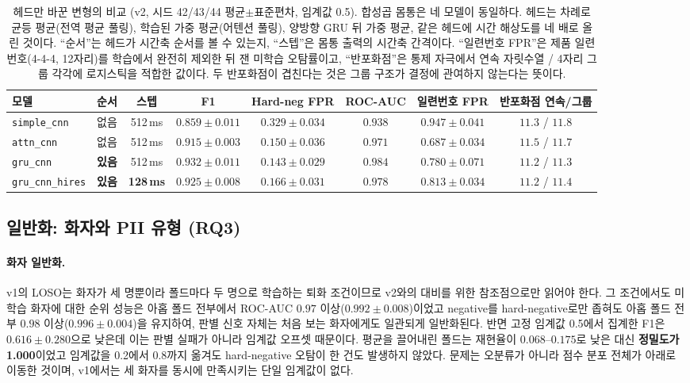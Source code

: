 \documentclass[10pt,twocolumn]{article}
\renewcommand{\emph}[1]{\textbf{#1}}
\begin{document}
\begin{table}[!t]
\centering
\caption{헤드만 바꾼 변형의 비교 (v2, 시드 42/43/44 평균$\pm$표준편차, 임계값 0.5). 합성곱
몸통은 네 모델이 동일하다. 헤드는 차례로 균등 평균(전역 평균 풀링), 학습된 가중 평균(어텐션
풀링), 양방향 GRU 뒤 가중 평균, 같은 헤드에 시간 해상도를 네 배로 올린 것이다. ``순서''는 헤드가
시간축 순서를 볼 수 있는지, ``스텝''은 몸통 출력의 시간축 간격이다. ``일련번호 FPR''은 제품 일련번호(4-4-4, 12자리)를 학습에서 완전히 제외한 뒤 잰
미학습 오탐률이고, ``반포화점''은 통제 자극에서 연속 자릿수열 / 4자리 그룹 각각에 로지스틱을
적합한 값이다. 두 반포화점이 겹친다는 것은 그룹 구조가 결정에 관여하지 않는다는 뜻이다.}
\label{tab:seqhead}
\small
\setlength{\tabcolsep}{5pt}
\begin{tabular}{lccccccc}
\toprule
모델 & 순서 & 스텝 & F1 & Hard-neg FPR & ROC-AUC & 일련번호 FPR & 반포화점 연속/그룹 \\
\midrule
\texttt{simple\_cnn} & 없음 & 512\,ms & $0.859\pm0.011$ & $0.329\pm0.034$ & $0.938$ & $0.947\pm0.041$ & $11.3$ / $11.8$ \\
\texttt{attn\_cnn} & 없음 & 512\,ms & $0.915\pm0.003$ & $0.150\pm0.036$ & $0.971$ & $\mathbf{0.687\pm0.034}$ & $11.5$ / $11.7$ \\
\texttt{gru\_cnn} & \textbf{있음} & 512\,ms & $\mathbf{0.932\pm0.011}$ & $\mathbf{0.143\pm0.029}$ & $\mathbf{0.984}$ & $0.780\pm0.071$ & $11.2$ / $11.3$ \\
\texttt{gru\_cnn\_hires} & \textbf{있음} & \textbf{128\,ms} & $0.925\pm0.008$ & $0.166\pm0.031$ & $0.978$ & $0.813\pm0.034$ & $11.2$ / $11.4$ \\
\bottomrule
\end{tabular}
\end{table}

\subsection{일반화: 화자와 PII 유형 (RQ3)}
\paragraph{화자 일반화.}
v1의 LOSO는 화자가 세 명뿐이라 폴드마다 두 명으로 학습하는 퇴화 조건이므로 v2와의 대비를 위한
참조점으로만 읽어야 한다. 그 조건에서도 미학습 화자에 대한 순위 성능은 아홉 폴드 전부에서
ROC-AUC $0.97$ 이상($0.992\pm0.008$)이었고 negative를 hard-negative로만 좁혀도 아홉 폴드 전부
$0.98$ 이상($0.996\pm0.004$)을 유지하여, 판별 신호 자체는 처음 보는 화자에게도 일관되게
일반화된다. 반면 고정 임계값 0.5에서 집계한 F1은 $0.616\pm0.280$으로 낮은데 이는 판별 실패가
아니라 임계값 오프셋 때문이다. 평균을 끌어내린 폴드는 재현율이 $0.068$--$0.175$로 낮은 대신
\emph{정밀도가 1.000}이었고 임계값을 0.2에서 0.8까지 옮겨도 hard-negative 오탐이 한 건도
발생하지 않았다. 문제는 오분류가 아니라 점수 분포 전체가 아래로 이동한 것이며, v1에서는 세
화자를 동시에 만족시키는 단일 임계값이 없다.
\end{document}

